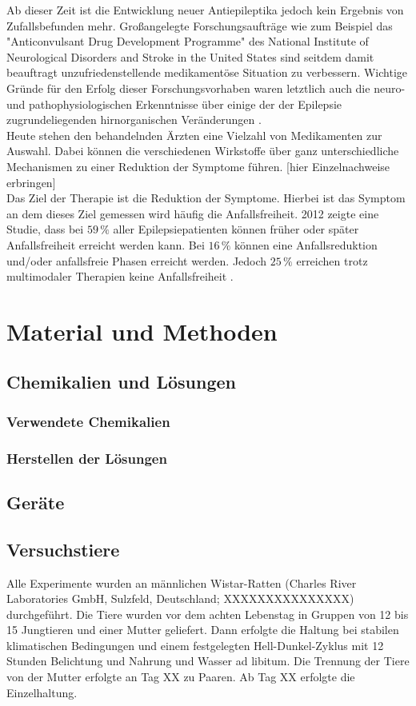 \documentclass[a4paper,11pt]{report}
\begin{document}
{Ab dieser Zeit ist die Entwicklung neuer Antiepileptika jedoch kein Ergebnis von Zufallsbefunden mehr. Großangelegte Forschungsaufträge wie zum Beispiel das "Anticonvulsant Drug Development Programme" des National Institute of Neurological Disorders and Stroke in the
United States\cite{Kehne.2017} sind seitdem damit beauftragt unzufriedenstellende medikamentöse Situation zu verbessern. Wichtige Gründe für den Erfolg dieser Forschungsvorhaben waren letztlich auch die neuro- und pathophysiologischen Erkenntnisse über einige der der Epilepsie zugrundeliegenden hirnorganischen Veränderungen \cite{Schneble.2013}.\\
Heute stehen den behandelnden Ärzten eine Vielzahl von Medikamenten zur Auswahl. Dabei können die verschiedenen Wirkstoffe über ganz unterschiedliche Mechanismen zu einer Reduktion der Symptome führen. [hier Einzelnachweise erbringen]\\
Das Ziel der Therapie ist die Reduktion der Symptome. Hierbei ist das Symptom an dem dieses Ziel gemessen wird häufig die Anfallsfreiheit. 2012 zeigte eine Studie, dass bei $59\,\%$ aller Epilepsiepatienten können früher oder später Anfallsfreiheit erreicht werden kann. Bei $16\,\%$ können eine Anfallsreduktion und/oder anfallsfreie Phasen erreicht werden. Jedoch $25\,\%$ erreichen trotz multimodaler Therapien keine Anfallsfreiheit \cite{Brodie.2012}.

\chapter{Material und Methoden}

\section{Chemikalien und Lösungen}

\subsection{Verwendete Chemikalien}

\subsection{Herstellen der Lösungen}

\section{Geräte}

\section{Versuchstiere}
Alle Experimente wurden an männlichen Wistar-Ratten (Charles River Laboratories GmbH, Sulzfeld, Deutschland; XXXXXXXXXXXXXXX) durchgeführt. Die Tiere wurden vor dem  achten Lebenstag in Gruppen von 12 bis 15 Jungtieren und einer Mutter geliefert. Dann erfolgte die Haltung bei stabilen klimatischen Bedingungen und einem festgelegten Hell-Dunkel-Zyklus mit 12 Stunden Belichtung und Nahrung und Wasser ad libitum. Die Trennung der Tiere von der Mutter erfolgte an Tag XX zu Paaren. Ab Tag XX erfolgte die Einzelhaltung.
}
\end{document}

